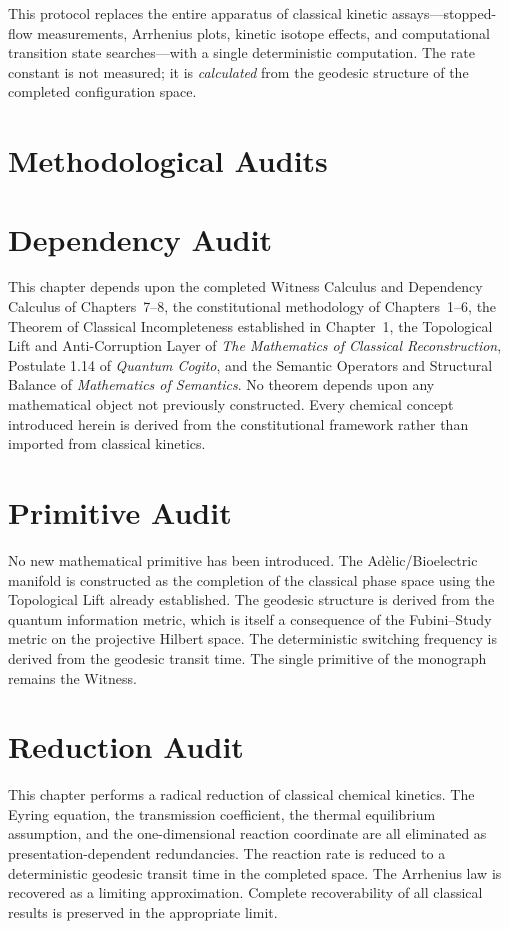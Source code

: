 \documentclass[11pt,openany]{extbook}
\newenvironment{dependencyaudit}{\section*{Dependency Audit}}{}
\newenvironment{primitiveaudit}{\section*{Primitive Audit}}{}
\newenvironment{reductionaudit}{\section*{Reduction Audit}}{}
\theoremstyle{plain}
\theoremstyle{definition}
\begin{document}
\noindent This protocol replaces the entire apparatus of classical kinetic assays---stopped-flow measurements, Arrhenius plots, kinetic isotope effects, and computational transition state searches---with a single deterministic computation. The rate constant is not measured; it is \emph{calculated} from the geodesic structure of the completed configuration space.

\section{Methodological Audits}

\begin{dependencyaudit}
\noindent This chapter depends upon the completed Witness Calculus and Dependency Calculus of Chapters~7--8, the constitutional methodology of Chapters~1--6, the Theorem of Classical Incompleteness established in Chapter~1, the Topological Lift and Anti-Corruption Layer of \emph{The Mathematics of Classical Reconstruction}, Postulate 1.14 of \emph{Quantum Cogito}, and the Semantic Operators and Structural Balance of \emph{Mathematics of Semantics}. No theorem depends upon any mathematical object not previously constructed. Every chemical concept introduced herein is derived from the constitutional framework rather than imported from classical kinetics.
\end{dependencyaudit}

\begin{primitiveaudit}
\noindent No new mathematical primitive has been introduced. The Adèlic/Bioelectric manifold is constructed as the completion of the classical phase space using the Topological Lift already established. The geodesic structure is derived from the quantum information metric, which is itself a consequence of the Fubini--Study metric on the projective Hilbert space. The deterministic switching frequency is derived from the geodesic transit time. The single primitive of the monograph remains the Witness.
\end{primitiveaudit}

\begin{reductionaudit}
\noindent This chapter performs a radical reduction of classical chemical kinetics. The Eyring equation, the transmission coefficient, the thermal equilibrium assumption, and the one-dimensional reaction coordinate are all eliminated as presentation-dependent redundancies. The reaction rate is reduced to a deterministic geodesic transit time in the completed space. The Arrhenius law is recovered as a limiting approximation. Complete recoverability of all classical results is preserved in the appropriate limit.
\end{reductionaudit}
\end{document}
